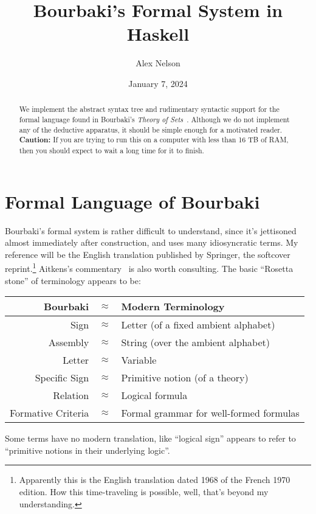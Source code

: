 \documentclass{amsart}
\title{Bourbaki's Formal System in Haskell}
\author{Alex Nelson}
\date{January 7, 2024}
\begin{document}
\maketitle

\begin{abstract}
We implement the abstract syntax tree and rudimentary syntactic support
for the formal language found in Bourbaki's \textit{Theory of Sets}~\cite{bourbaki1968sets}.
Although we do not implement any of the deductive apparatus, it should
be simple enough for a motivated reader.
\textbf{Caution:} If you are trying to run this on a computer with less
than 16 TB of RAM, then you should expect to wait a long time for it to finish.
\end{abstract}

\tableofcontents

\section{Formal Language of Bourbaki}

Bourbaki's formal system is rather difficult to understand, since it's
jettisoned almost immediately after construction, and uses many
idiosyncratic terms. My reference will be the English translation
published by Springer, the softcover reprint.\footnote{Apparently this
is the English translation dated 1968 of the French 1970 edition. How
this time-traveling is possible, well, that's beyond my understanding.}
Aitkens's commentary~\cite{aitkens2022commentary} is also worth consulting.
The basic ``Rosetta stone'' of terminology appears to be:
\begin{center}
\begin{tabular}{rcl}
Bourbaki & $\approx$ & Modern Terminology\\\hline
Sign     & $\approx$ & Letter (of a fixed ambient alphabet)\\
Assembly & $\approx$ & String (over the ambient alphabet)\\
Letter   & $\approx$ & Variable\\
Specific Sign & $\approx$ & Primitive notion (of a theory)\\
Relation & $\approx$ & Logical formula\\
Formative Criteria & $\approx$ & Formal grammar for well-formed formulas\\
\end{tabular}
\end{center}
Some terms have no modern translation, like ``logical sign'' appears to
refer to ``primitive notions in their underlying logic''.
\end{document}
